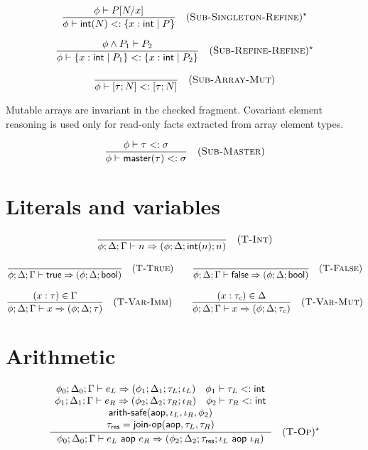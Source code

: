$$\frac{\phi \vdash P[N/x]}{\phi \vdash \textsf{int}(N) <: \{x: \textsf{int} \mid P\}} \quad (\textsc{Sub-Singleton-Refine})^\star$$

$$\frac{\phi \wedge P_1 \vdash P_2}{\phi \vdash \{x: \textsf{int} \mid P_1\} <: \{x: \textsf{int} \mid P_2\}} \quad (\textsc{Sub-Refine-Refine})^\star$$

$$\frac{}{\phi \vdash [\tau; N] <: [\tau; N]} \quad (\textsc{Sub-Array-Mut})$$

\noindent Mutable arrays are invariant in the checked fragment. Covariant element reasoning is used only for read-only facts extracted from array element types.

$$\frac{\phi \vdash \tau <: \sigma}{\phi \vdash \textsf{master}(\tau) <: \sigma} \quad (\textsc{Sub-Master})$$

\section*{Literals and variables}

$$\frac{}{\phi; \Delta; \Gamma \vdash n \Rightarrow (\phi; \Delta; \textsf{int}(n); n)} \quad (\textsc{T-Int})$$

$$\frac{}{\phi; \Delta; \Gamma \vdash \textsf{true} \Rightarrow (\phi; \Delta; \textsf{bool})} \quad (\textsc{T-True})
  \qquad
  \frac{}{\phi; \Delta; \Gamma \vdash \textsf{false} \Rightarrow (\phi; \Delta; \textsf{bool})} \quad (\textsc{T-False})$$

$$\frac{(x: \tau) \in \Gamma}{\phi; \Delta; \Gamma \vdash x \Rightarrow (\phi; \Delta; \tau)} \quad (\textsc{T-Var-Imm})
  \qquad
  \frac{(x: \tau_c) \in \Delta}{\phi; \Delta; \Gamma \vdash x \Rightarrow (\phi; \Delta; \tau_c)} \quad (\textsc{T-Var-Mut})$$

\section*{Arithmetic}

$$
  \frac{
    \begin{array}{c}
      \phi_0; \Delta_0; \Gamma \vdash e_L \Rightarrow (\phi_1; \Delta_1; \tau_L; \iota_L) \quad \phi_1 \vdash \tau_L <: \textsf{int} \\
      \phi_1; \Delta_1; \Gamma \vdash e_R \Rightarrow (\phi_2; \Delta_2; \tau_R; \iota_R) \quad \phi_2 \vdash \tau_R <: \textsf{int} \\
      \textsf{arith-safe}(\textsf{aop}, \iota_L, \iota_R, \phi_2) \\
      \tau_\textsf{res} = \textsf{join-op}(\textsf{aop}, \tau_L, \tau_R)
    \end{array}
  }{
    \phi_0; \Delta_0; \Gamma \vdash e_L \textsf{ aop } e_R \Rightarrow (\phi_2; \Delta_2; \tau_\textsf{res}; \iota_L \textsf{ aop } \iota_R)
  } \quad (\textsc{T-Op})^\star
$$

